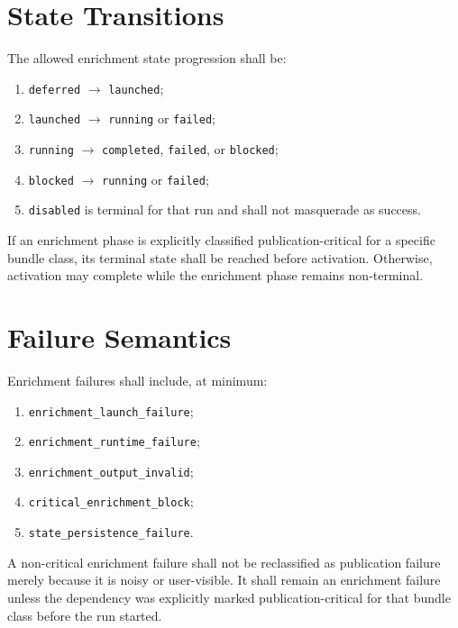 \documentclass[11pt]{report}
\begin{document}
\section{State Transitions}
The allowed enrichment state progression shall be:
\begin{enumerate}[leftmargin=1.2cm]
    \item \texttt{deferred} \(\rightarrow\) \texttt{launched};
    \item \texttt{launched} \(\rightarrow\) \texttt{running} or \texttt{failed};
    \item \texttt{running} \(\rightarrow\) \texttt{completed}, \texttt{failed}, or \texttt{blocked};
    \item \texttt{blocked} \(\rightarrow\) \texttt{running} or \texttt{failed};
    \item \texttt{disabled} is terminal for that run and shall not masquerade as success.
\end{enumerate}

If an enrichment phase is explicitly classified publication-critical for a specific bundle class, its terminal state shall be reached before activation. Otherwise, activation may complete while the enrichment phase remains non-terminal.

\section{Failure Semantics}
Enrichment failures shall include, at minimum:
\begin{enumerate}[leftmargin=1.2cm]
    \item \texttt{enrichment\_launch\_failure};
    \item \texttt{enrichment\_runtime\_failure};
    \item \texttt{enrichment\_output\_invalid};
    \item \texttt{critical\_enrichment\_block};
    \item \texttt{state\_persistence\_failure}.
\end{enumerate}

A non-critical enrichment failure shall not be reclassified as publication failure merely because it is noisy or user-visible. It shall remain an enrichment failure unless the dependency was explicitly marked publication-critical for that bundle class before the run started.
\end{document}
